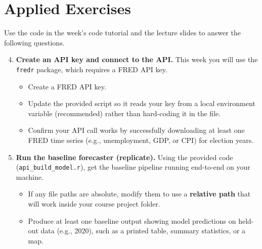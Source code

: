 \documentclass[11pt]{article}
\begin{document}
\section*{Applied Exercises}
Use the code in the week’s code tutorial and the lecture slides to answer the following questions.  \bigskip 

  \begin{enumerate}
\setcounter{enumi}{3}

\item \textbf{Create an API key and connect to the API.}
This week you will use the \texttt{fredr} package, which requires a FRED API key.
\begin{itemize}
  \item Create a FRED API key.
  \item Update the provided script so it reads your key from a local environment variable (recommended) rather than hard-coding it in the file.
  \item Confirm your API call works by successfully downloading at least one FRED time series (e.g., unemployment, GDP, or CPI) for election years.
\end{itemize}

\item \textbf{Run the baseline forecaster (replicate).}
Using the provided code (\texttt{api\_build\_model.r}), get the baseline pipeline running end-to-end on your machine.
\begin{itemize}
  \item If any file paths are absolute, modify them to use a \textbf{relative path} that will work inside your course project folder.
  \item Produce at least one baseline output showing model predictions on held-out data (e.g., 2020), such as a printed table, summary statistics, or a map.
\end{itemize}


\end{enumerate}
\end{document}
